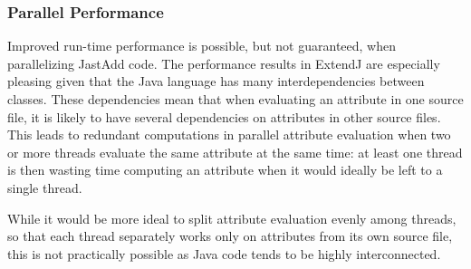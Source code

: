 \documentclass[10pt, twoside, openright]{book}
\begin{document}
%
%
%
%
%
%


\subsubsection{Parallel Performance}

Improved run-time performance is possible, but not guaranteed, when parallelizing JastAdd code.
The performance results in ExtendJ are especially pleasing given that the Java language
has many interdependencies between classes. These dependencies mean that when evaluating an attribute
in one source file,
it is likely to have several dependencies on attributes in other source files.
This leads to redundant computations in parallel attribute evaluation when two or more threads
evaluate the same attribute
at the same time: at least one thread is then wasting time computing an attribute when it would
ideally be left to a single thread.

While it would be more ideal to split attribute evaluation evenly among threads, so that each
thread separately works only on attributes from its own source file, this is not practically
possible as Java code tends to be highly interconnected.
\end{document}
